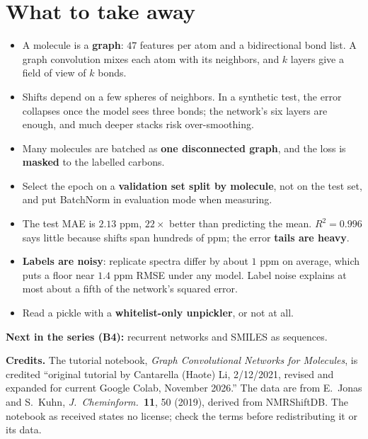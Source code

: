 \documentclass[11pt]{article}
\begin{document}
\section{What to take away}
\begin{keybox}[Summary]
\begin{itemize}[nosep]
  \item A molecule is a \textbf{graph}: $47$ features per atom and a bidirectional bond list. A graph convolution mixes each atom with its neighbors, and $k$ layers give a field of view of $k$ bonds.
  \item Shifts depend on a few spheres of neighbors. In a synthetic test, the error collapses once the model sees three bonds; the network's six layers are enough, and much deeper stacks risk over-smoothing.
  \item Many molecules are batched as \textbf{one disconnected graph}, and the loss is \textbf{masked} to the labelled carbons.
  \item Select the epoch on a \textbf{validation set split by molecule}, not on the test set, and put BatchNorm in evaluation mode when measuring.
  \item The test MAE is $2.13$ ppm, $22\times$ better than predicting the mean. $R^2=0.996$ says little because shifts span hundreds of ppm; the error \textbf{tails are heavy}.
  \item \textbf{Labels are noisy}: replicate spectra differ by about $1$ ppm on average, which puts a floor near $1.4$ ppm RMSE under any model. Label noise explains at most about a fifth of the network's squared error.
  \item Read a pickle with a \textbf{whitelist-only unpickler}, or not at all.
\end{itemize}
\end{keybox}

\textbf{Next in the series (B4):} recurrent networks and SMILES as sequences.

\vspace{0.5em}
{\footnotesize\textbf{Credits.} The tutorial notebook, \textit{Graph Convolutional Networks for Molecules}, is credited ``original tutorial by Cantarella (Haote) Li, 2/12/2021, revised and expanded for current Google Colab, November 2026.'' The data are from E.~Jonas and S.~Kuhn, \textit{J.\ Cheminform.}\ \textbf{11}, 50 (2019), derived from NMRShiftDB. The notebook as received states no license; check the terms before redistributing it or its data.}
\end{document}
